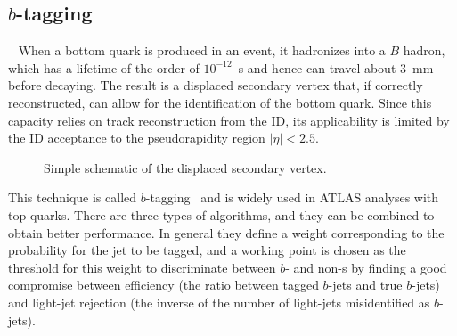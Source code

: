 






\myskip
\tocless\subsection{$b$-tagging}~\label{sec:btagging}
When a bottom quark is produced in an event, it hadronizes into a $B$ hadron, which has
a lifetime of the order of $10^{-12}$~s and hence can travel about 3~mm before decaying.
The result is a displaced secondary vertex that, if correctly reconstructed, can
allow for the identification of the bottom quark. 
Since this capacity relies on track reconstruction from the ID, its applicability
is limited by the ID acceptance to the pseudorapidity region $|\eta|<2.5$.

\begin{figure}[tb]\begin{center}
	\caption{Simple schematic of the displaced secondary vertex.\label{fig:btagvtx}}
\end{center}\end{figure}

This technique is called $b$-tagging~\cite{ref:ATLAS-CONF-2011-102} and is
widely used in ATLAS analyses with top quarks. There are three types of algorithms,
and they can be combined to obtain better performance. In general they define a weight
corresponding to the probability for the jet to be tagged, and a working point is chosen
as the threshold for this weight to discriminate between $b$- and non-\bjet s
by finding a good compromise between efficiency (the ratio between tagged
$b$-jets and true $b$-jets) and light-jet rejection
(the inverse of the number of light-jets misidentified as $b$-jets).

